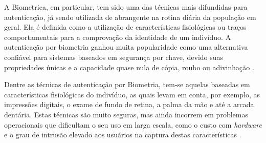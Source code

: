 

A Biometrica, em particular, tem sido uma das técnicas mais difundidas para autenticação, já sendo utilizada de abrangente na rotina diária da população em geral. Ela é definida como a utilização de características fisiológicas ou traços comportamentais para a comprovação da identidade de um indivíduo. A autenticação por biometria ganhou muita popularidade como uma alternativa confiável para sistemas baseados em segurança por chave, devido suas propriedades únicas e a capacidade quase nula de cópia, roubo ou adivinhação \cite{kholmatov}.

Dentre as técnicas de autenticação por Biometria, tem-se aquelas baseadas em características fisiológicas do indivíduo, as quais levam em conta, por exemplo, as impressões digitais, o exame de fundo de retina, a palma da mão e até a arcada dentária. Estas técnicas são muito seguras, mas ainda incorrem em problemas operacionais que dificultam o seu uso em larga escala, como o custo com \emph{hardware} e o grau de intrusão elevado aos usuários na captura destas características \cite{heinen2002}. 


